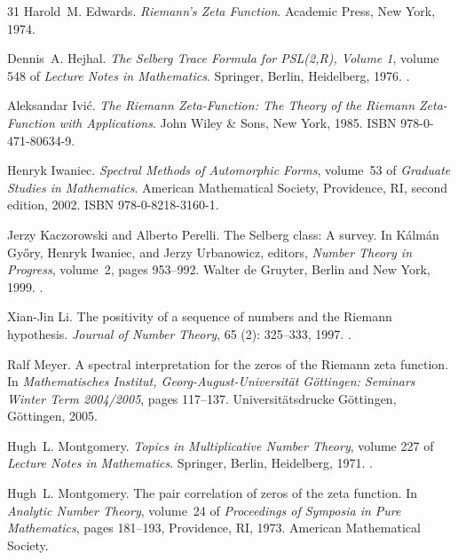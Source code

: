 \documentclass[11pt]{article}
\theoremstyle{definition}
\begin{document}
\begin{thebibliography}{31}
Harold~M. Edwards.
\newblock \emph{{Riemann}'s Zeta Function}.
\newblock Academic Press, New York, 1974.

Dennis~A. Hejhal.
\newblock \emph{The {Selberg} Trace Formula for {PSL}(2,{R}), Volume 1}, volume 548 of \emph{Lecture Notes in Mathematics}.
\newblock Springer, Berlin, Heidelberg, 1976.
\newblock {}.

Aleksandar Ivi{\'c}.
\newblock \emph{The {Riemann} Zeta-Function: The Theory of the {Riemann} Zeta-Function with Applications}.
\newblock John Wiley \& Sons, New York, 1985.
\newblock ISBN 978-0-471-80634-9.

Henryk Iwaniec.
\newblock \emph{Spectral Methods of Automorphic Forms}, volume~53 of \emph{Graduate Studies in Mathematics}.
\newblock American Mathematical Society, Providence, RI, second edition, 2002.
\newblock ISBN 978-0-8218-3160-1.

Jerzy Kaczorowski and Alberto Perelli.
\newblock The {Selberg} class: A survey.
\newblock In K{\'a}lm{\'a}n Gy{\H{o}}ry, Henryk Iwaniec, and Jerzy Urbanowicz, editors, \emph{Number Theory in Progress}, volume~2, pages 953--992. Walter de Gruyter, Berlin and New York, 1999.
\newblock {}.

Xian-Jin Li.
\newblock The positivity of a sequence of numbers and the {Riemann} hypothesis.
\newblock \emph{Journal of Number Theory}, 65 (2): 325--333, 1997.
\newblock {}.

Ralf Meyer.
\newblock A spectral interpretation for the zeros of the {Riemann} zeta function.
\newblock In \emph{Mathematisches Institut, Georg-August-Universit{\"a}t G{\"o}ttingen: Seminars Winter Term 2004/2005}, pages 117--137. Universit{\"a}tsdrucke G{\"o}ttingen, G{\"o}ttingen, 2005.

Hugh~L. Montgomery.
\newblock \emph{Topics in Multiplicative Number Theory}, volume 227 of \emph{Lecture Notes in Mathematics}.
\newblock Springer, Berlin, Heidelberg, 1971.
\newblock {}.

Hugh~L. Montgomery.
\newblock The pair correlation of zeros of the zeta function.
\newblock In \emph{Analytic Number Theory}, volume~24 of \emph{Proceedings of Symposia in Pure Mathematics}, pages 181--193, Providence, RI, 1973. American Mathematical Society.


\end{thebibliography}
\end{document}
